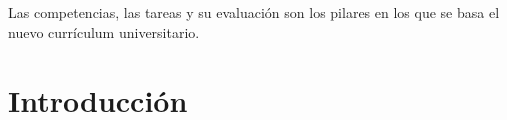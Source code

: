 



\begin{savequote}[50mm]
Las competencias, las tareas y su evaluación son los pilares en los que se basa el nuevo currículum universitario. 
\end{savequote}

\chapter{Introducción}
\label{cha:Introduction}

\ifpdf
    \graphicspath{{1_introduction/figures/PNG/}{1_introduction/figures/PDF/}{1_introduction/figures/}}
\else
    \graphicspath{{1_introduction/figures/EPS/}{1_introduction/figures/}}
\fi






